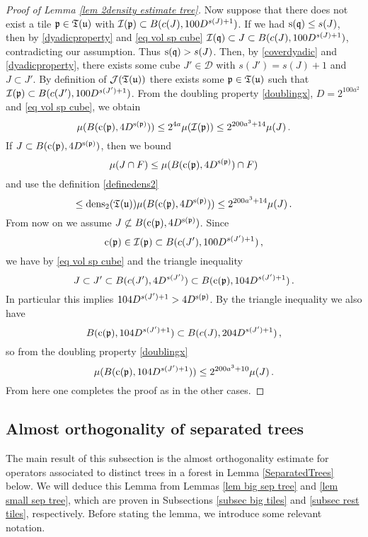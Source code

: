 {\begin{proof}[Proof of Lemma \ref{lem 2density estimate tree}]
    Now suppose that there does not exist a tile $\mathfrak p \in \mathfrak T(\mathfrak u)$ with $\mathcal{I}(\mathfrak p) \subset B(c(J), 100 D^{s(J) + 1})$. If we had $\mathrm{s}(\mathfrak q) \le s(J)$, then by \eqref{dyadicproperty} and \eqref{eq vol sp cube}  $\mathcal{I}(\mathfrak q) \subset J \subset B(c(J), 100 D^{s(J) + 1})$, contradicting our assumption. Thus $\mathrm{s}(\mathfrak q) > s(J)$. Then, by \eqref{coverdyadic} and \eqref{dyadicproperty}, there exists some cube $J' \in \mathcal{D}$ with $s(J') = s(J) + 1$ and $J \subset J'$. By definition of $\mathcal{J}(\mathfrak T(\mathfrak u))$ there exists some $\mathfrak p \in \mathfrak T(\mathfrak u)$ such that $\mathcal{I}(\mathfrak p) \subset B(c(J'), 100 D^{s(J') + 1})$.  From the doubling property \eqref{doublingx}, $D=2^{100a^2}$ and \eqref{eq vol sp cube}, we obtain
    \begin{equation}
        \label{eq measure comparison 1}
        \mu(B(\mathrm{c}(\mathfrak p), 4D^{\mathrm{s}(\mathfrak p)})) \le 2^{4a} \mu(\mathcal{I}(\mathfrak p)) \le 2^{200a^3 + 14} \mu(J)\,.
    \end{equation}
    If $J \subset B(\mathrm{c}(\mathfrak p), 4 D^{\mathrm{s}(\mathfrak p)})$, then we bound
    $$
        \mu(J \cap F) \le \mu(B(\mathrm{c}(\mathfrak p), 4D^{\mathrm{s}(\mathfrak p)}) \cap F)
    $$
    and use the definition \eqref{definedens2}
    $$
        \le \operatorname{\operatorname{dens}}_2(\mathfrak T(\mathfrak u)) \mu(B(\mathrm{c}(\mathfrak p), 4D^{\mathrm{s}(\mathfrak p)})) \le 2^{200a^3 + 14} \mu(J)\,.
    $$
    From now on we assume $J \not \subset B(\mathrm{c}(\mathfrak p), 4 D^{\mathrm{s}(\mathfrak p)})$.
    Since
    \begin{equation*}
        \mathrm{c}(\mathfrak p) \in \mathcal{I}(\mathfrak p) \subset B(c(J'), 100 D^{s(J') + 1})\, ,
    \end{equation*}
    we have by \eqref{eq vol sp cube} and the triangle inequality
    $$
        J \subset J' \subset B(c(J'), 4D^{s(J')}) \subset B(\mathrm{c}(\mathfrak p), 104 D^{s(J') + 1})\,.
    $$
    In particular this implies $104 D^{s(J') + 1} > 4D^{\mathrm{s}(\mathfrak p)}$. By the triangle inequality we also have
    $$
        B(\mathrm{c}(\mathfrak p), 104 D^{s(J') + 1}) \subset B(c(J), 204 D^{s(J') + 1})\,,
    $$
    so from the doubling property \eqref{doublingx}
    $$
        \mu( B(\mathrm{c}(\mathfrak p), 104 D^{s(J') + 1})) \le 2^{200a^3 + 10} \mu(J)\,.
    $$
    From here one completes the proof as in the other cases.
\end{proof}

\subsection{Almost orthogonality of separated trees}

The main result of this subsection is the almost orthogonality estimate for operators associated to distinct trees in a forest in Lemma \ref{SeparatedTrees} below. We will deduce this Lemma from Lemmas \ref{lem big sep tree} and \ref{lem small sep tree}, which are proven in Subsections \ref{subsec big tiles} and \ref{subsec rest tiles}, respectively. Before stating the lemma, we introduce some relevant notation.

}
